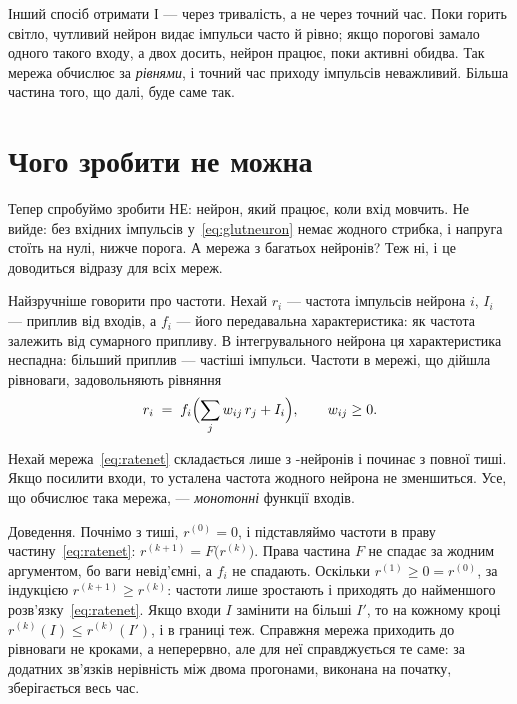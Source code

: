 Інший спосіб отримати І --- через тривалість, а не через точний час. Поки горить світло, чутливий нейрон видає імпульси часто й рівно; якщо порогові замало одного такого входу, а двох досить, нейрон працює, поки активні обидва. Так мережа обчислює за \emph{рівнями}, і точний час приходу імпульсів неважливий. Більша частина того, що далі, буде саме так.

\section{Чого зробити не можна}

Тепер спробуймо зробити НЕ: нейрон, який працює, коли вхід мовчить. Не вийде: без вхідних імпульсів у~\eqref{eq:glutneuron} немає жодного стрибка, і напруга стоїть на нулі, нижче порога. А мережа з багатьох нейронів? Теж ні, і це доводиться відразу для всіх мереж.

Найзручніше говорити про частоти. Нехай $r_i$ --- частота імпульсів нейрона $i$, $I_i$ --- приплив від входів, а $f_i$ --- його передавальна характеристика: як частота залежить від сумарного припливу. В інтегрувального нейрона ця характеристика неспадна: більший приплив --- частіші імпульси. Частоти в мережі, що дійшла рівноваги, задовольняють рівняння
\begin{equation}
r_i \;=\; f_i\Bigl(\sum_j w_{ij}\,r_j + I_i\Bigr), \qquad w_{ij}\ge 0 .
\label{eq:ratenet}
\end{equation}

\begin{keyblock}
\begin{proposition}[Монотонність]
\label{prop:monotone}
Нехай мережа~\eqref{eq:ratenet} складається лише з -нейронів і починає з повної тиші. Якщо посилити входи, то усталена частота жодного нейрона не зменшиться. Усе, що обчислює така мережа, --- \emph{монотонні} функції входів.
\end{proposition}
\end{keyblock}

Доведення. Почнімо з тиші, $r^{(0)}=0$, і підставляймо частоти в праву частину~\eqref{eq:ratenet}: $r^{(k+1)}=F\bigl(r^{(k)}\bigr)$. Права частина $F$ не спадає за жодним аргументом, бо ваги невід'ємні, а $f_i$ не спадають. Оскільки $r^{(1)}\ge0=r^{(0)}$, за індукцією $r^{(k+1)}\ge r^{(k)}$: частоти лише зростають і приходять до найменшого розв'язку~\eqref{eq:ratenet}. Якщо входи $I$ замінити на більші $I'$, то на кожному кроці $r^{(k)}(I)\le r^{(k)}(I')$, і в границі теж. Справжня мережа приходить до рівноваги не кроками, а неперервно, але для неї справджується те саме: за додатних зв'язків нерівність між двома прогонами, виконана на початку, зберігається весь час.

